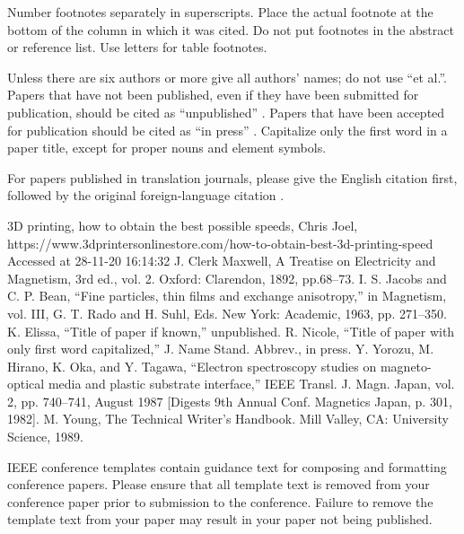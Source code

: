 \documentclass[conference]{IEEEtran}
\begin{document}
Number footnotes separately in superscripts. Place the actual footnote at 
the bottom of the column in which it was cited. Do not put footnotes in the 
abstract or reference list. Use letters for table footnotes.

Unless there are six authors or more give all authors' names; do not use 
``et al.''. Papers that have not been published, even if they have been 
submitted for publication, should be cited as ``unpublished'' \cite{b4}. Papers 
that have been accepted for publication should be cited as ``in press'' \cite{b5}. 
Capitalize only the first word in a paper title, except for proper nouns and 
element symbols.

For papers published in translation journals, please give the English 
citation first, followed by the original foreign-language citation \cite{b6}.

\begin{thebibliography}{00}
 3D printing, how to obtain the best possible speeds, Chris Joel, https://www.3dprintersonlinestore.com/how-to-obtain-best-3d-printing-speed Accessed at 28-11-20 16:14:32
 J. Clerk Maxwell, A Treatise on Electricity and Magnetism, 3rd ed., vol. 2. Oxford: Clarendon, 1892, pp.68--73.
 I. S. Jacobs and C. P. Bean, ``Fine particles, thin films and exchange anisotropy,'' in Magnetism, vol. III, G. T. Rado and H. Suhl, Eds. New York: Academic, 1963, pp. 271--350.
 K. Elissa, ``Title of paper if known,'' unpublished.
 R. Nicole, ``Title of paper with only first word capitalized,'' J. Name Stand. Abbrev., in press.
 Y. Yorozu, M. Hirano, K. Oka, and Y. Tagawa, ``Electron spectroscopy studies on magneto-optical media and plastic substrate interface,'' IEEE Transl. J. Magn. Japan, vol. 2, pp. 740--741, August 1987 [Digests 9th Annual Conf. Magnetics Japan, p. 301, 1982].
 M. Young, The Technical Writer's Handbook. Mill Valley, CA: University Science, 1989.
\end{thebibliography}
\vspace{12pt}
\color{red}
IEEE conference templates contain guidance text for composing and formatting conference papers. Please ensure that all template text is removed from your conference paper prior to submission to the conference. Failure to remove the template text from your paper may result in your paper not being published.
\end{document}
